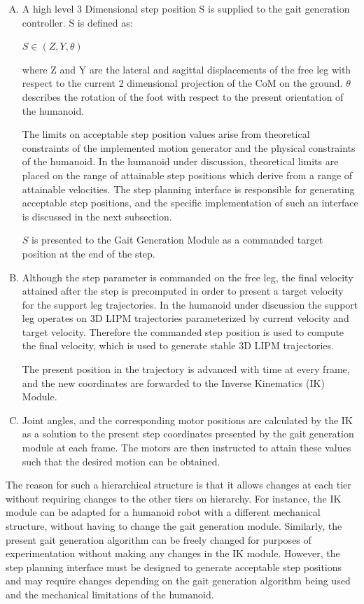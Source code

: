 \documentclass[letterpaper, 10 pt, conference]{ieeeconf}  %
\begin{document}
	\begin{enumerate}[A)]
  \item A high level 3 Dimensional step position S is
  supplied to the gait generation controller. S is defined as:
  	
  	\begin{center}$S \in (Z, Y, \theta)$\end{center}
 where Z and Y are the lateral and sagittal displacements of the
 free leg with respect to the current 2 dimensional projection of the CoM on
  the ground. $\theta$ describes the rotation of the foot with respect
  to the present orientation of the humanoid. 

The limits on acceptable step position values arise from theoretical constraints of the implemented motion generator and the physical constraints of the humanoid. 
In the humanoid under discussion, theoretical limits are placed on the range of attainable step positions which derive from a range of attainable velocities.
The step planning interface is responsible for generating acceptable step positions, and the specific implementation of such an interface is discussed in the next subsection.
  	
  $S$ is presented to the Gait Generation Module as a commanded target position at the end of the step.
  \item Although the step parameter is commanded on the free leg, the final velocity attained after the step is precomputed in order
to present a target velocity for the support leg trajectories. In the humanoid under discussion the support leg operates on 3D LIPM trajectories parameterized by current velocity and target velocity. Therefore the commanded step position is used to compute the final velocity, which is used to generate stable 3D LIPM trajectories. 
  
  The present position in the trajectory is advanced with time at every frame,
  and the new coordinates are forwarded to the Inverse Kinematics (IK) Module.
  \item Joint angles, and the corresponding motor
  positions are calculated by the IK as a solution to the present step
  coordinates presented by the gait generation module at each frame. The motors
  are then instructed to attain these values such that the desired motion can be
  obtained.
\end{enumerate}

The reason for such a hierarchical structure is that it allows changes at each
tier without requiring changes to the other tiers on hierarchy. For instance,
the IK module can be adapted for a humanoid robot with a
different mechanical structure, without having to change the gait generation
module. Similarly, the present gait generation algorithm can be freely changed
for purposes of experimentation without making any changes in the IK module. However, the step planning interface must be designed to generate acceptable step positions and may require changes depending on the gait generation algorithm being used and the mechanical limitations of the humanoid.
\end{document}
